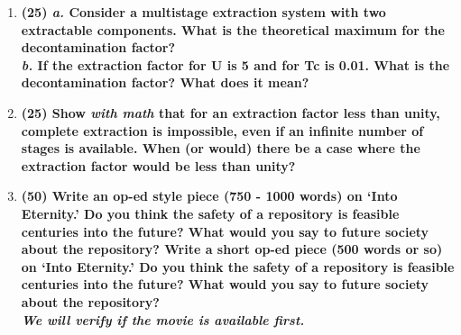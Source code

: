 \documentclass[11pt,a4paper]{article}
\begin{document}
\begin{enumerate}[leftmargin=*,topsep=0pt,font=\bfseries]
        \newpage 
    \item\textbf{(25) \textit{a.} Consider a multistage extraction system with two extractable components. What is the theoretical maximum for the decontamination factor?\\
        \textit{b.} If the extraction factor for U is 5 and for Tc is 0.01. What is the decontamination factor? What does it mean?}
        \vspace{0.25in}\\
       
       
       
       
       
       
       
       
       
       
       
       
       
       
       
       \newpage 
   \item\textbf{(25) Show \textit{with math} that for an extraction factor less than unity, complete extraction is impossible, even if an infinite number of stages is available. When (or would) there be a case where the extraction factor would be less than unity?}
        \vspace{0.25in}\\
       
       
       
       
       
       
       
       
       
       
       
       
       
       
       
       \newpage 
   \item\textbf{(50) Write an op-ed style piece (750 - 1000 words) on `Into Eternity.' Do you think the safety of a repository is feasible centuries into the future? What would you say to future society about the repository? Write a short op-ed piece (500 words or so) on ‘Into Eternity.’ Do you think the safety of a repository is feasible centuries into the future? What would you say to future society about the repository?\\
       \textit{We will verify if the movie is available first.}}
        \vspace{0.25in}\\
       
       
       

\end{enumerate}
\end{document}
